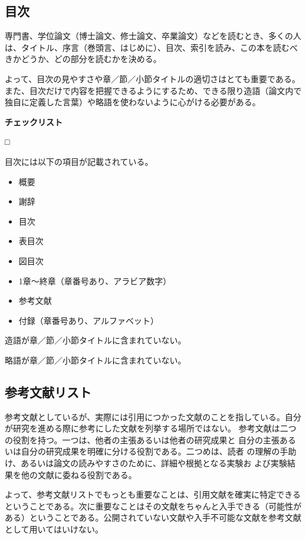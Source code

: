 \documentclass[11pt,a4j]{jsarticle}
\begin{document}
\subsection{目次}

専門書、学位論文（博士論文、修士論文、卒業論文）などを読むとき、多くの人
は、タイトル、序言（巻頭言、はじめに）、目次、索引を読み、この本を読むべ
きかどうか、どの部分を読むかを決める。

よって、目次の見やすさや章／節／小節タイトルの適切さはとても重要である。
また、目次だけで内容を把握できるようにするため、できる限り造語（論文内で
独自に定義した言葉）や略語を使わないように心がける必要がある。

\begin{flushleft}
 {\bf チェックリスト}
\end{flushleft}
\begin{list}%
 {□} %
 {} %
 \item 目次には以下の項目が記載されている。
       \begin{itemize}
	\item 概要
	\item 謝辞
	\item 目次
	\item 表目次
	\item 図目次
	\item 1章〜終章（章番号あり、アラビア数字）
	\item 参考文献
	\item 付録（章番号あり、アルファベット）
       \end{itemize}
 \item 造語が章／節／小節タイトルに含まれていない。
 \item 略語が章／節／小節タイトルに含まれていない。
\end{list}

\subsection{参考文献リスト}

参考文献としているが、実際には引用につかった文献のことを指している。自分
が研究を進める際に参考にした文献を列挙する場所ではない。
参考文献は二つの役割を持つ。一つは、他者の主張あるいは他者の研究成果と
自分の主張あるいは自分の研究成果を明確に分ける役割である。二つめは、読者
の理解の手助け、あるいは論文の読みやすさのために、詳細や根拠となる実験お
よび実験結果を他の文献に委ねる役割である。

よって、参考文献リストでもっとも重要なことは、引用文献を確実に特定できる
ということである。次に重要なことはその文献をちゃんと入手できる（可能性が
ある）ということである。公開されていない文献や入手不可能な文献を参考文献
として用いてはいけない。
\end{document}
